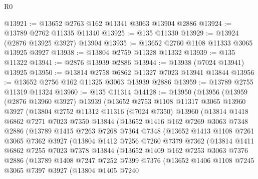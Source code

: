 \begin{lexlean}{R0}
\begin{coremodule}
@13921 := @13652 @2763 @162 @11341 @3063 @13904 @2886
@13924 := @13789 @2762 @11335 @11340
@13925 := @135 @11330
@13929 := @13924 (@2876 @13925 @3927) @13904
@13935 := @13652 @2760 @1108 @11333 @3065 @13925 @3927
@13938 := @13804 @2759 @11328 @11332
@13939 := @135 @11322
@13941 := @2876 @13939 @2886
@13944 := @13938 (@7024 @13941) @13925
@13950 := @13814 @2758 @6862 @11327 @7023 @13941 @13844
@13956 := @13652 @2756 @162 @11325 @3063 @13939 @2886
@13959 := @13789 @2755 @11319 @11324
@13960 := @135 @11314
@14128 := @13950
    (@13956
      (@13959
        (@2876 @13960 @3927)
        @13939
        (@13652
          @2753
          @1108
          @11317
          @3065
          @13960
          @3927
          (@13804
            @2752
            @11312
            @11316
            (@7024 @7350)
            @13960
            (@13814
              @1418
              @6862
              @7271
              @7023
              @7350
              @13844
              (@13652
                @1416
                @162
                @7269
                @3063
                @7348
                @2886
                (@13789
                  @1415
                  @7263
                  @7268
                  @7364
                  @7348
                  (@13652
                    @1413
                    @1108
                    @7261
                    @3065
                    @7362
                    @3927
                    (@13804
                      @1412
                      @7256
                      @7260
                      @7379
                      @7362
                      (@13814
                        @1411
                        @6862
                        @7255
                        @7023
                        @7378
                        @13844
                        (@13652
                          @1409
                          @162
                          @7253
                          @3063
                          @7376
                          @2886
                          (@13789
                            @1408
                            @7247
                            @7252
                            @7399
                            @7376
                            (@13652
                              @1406
                              @1108
                              @7245
                              @3065
                              @7397
                              @3927
                              (@13804
                                @1405
                                @7240

\end{coremodule}
\end{lexlean}
